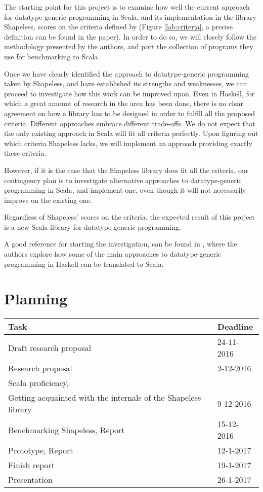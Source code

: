 \documentclass{article}
\begin{document}
The starting point for this project is to examine how well the current approach for datatype-generic programming in Scala, and its implementation in the library Shapeless, scores on the criteria defined by \cite{rodriguez2008comparing} (Figure \ref{lab:criteria}, a precise definition can be found in the paper). In order to do so, we will closely follow the methodology presented by the authors, and port the collection of programs they use for benchmarking to Scala.

Once we have clearly identified the approach to datatype-generic programming taken by Shapeless, and have established its strengths and weaknesses, we can proceed to investigate how this work can be improved upon.
Even in Haskell, for which a great amount of research in the area  has been done, there is no clear agreement on how a library has to be designed in order to fulfill all the proposed criteria. Different approaches embrace different trade-offs. We do not expect that the only existing approach in Scala will fit all criteria perfectly. Upon figuring out which criteria Shapeless lacks, we will implement an approach providing exactly these criteria. 

However, if it is the case that the Shapeless library does fit all the criteria, our contingency plan is to investigate alternative approaches to datatype-generic programming in Scala, and implement one, even though it will not necessarily improve on the existing one.

Regardless of Shapeless' scores on the criteria, the expected result of this project is a new Scala library for datatype-generic programming.

A good reference for starting the investigation, can be found in \cite{Oliveira08scalafor}, where the authors explore how some of the main approaches to datatype-generic programming in Haskell can be translated to Scala.

\section{Planning}

\begin{tabular}{|l|l|}
\hline
\textbf{Task}                    & \textbf{Deadline}   \\ \hline
Draft research proposal  & 24-11-2016 \\ \hline
Research proposal       & 2-12-2016  \\ \hline
Scala proficiency,  	& \\
Getting acquainted with the internals of the Shapeless library		& 9-12-2016 \\ \hline
Benchmarking Shapeless, Report & 15-12-2016 \\ \hline
Prototype, Report      			& 12-1-2017  \\ \hline
Finish report & 19-1-2017 \\ \hline
Presentation      		& 26-1-2017  \\ \hline
\end{tabular}



\end{document}
